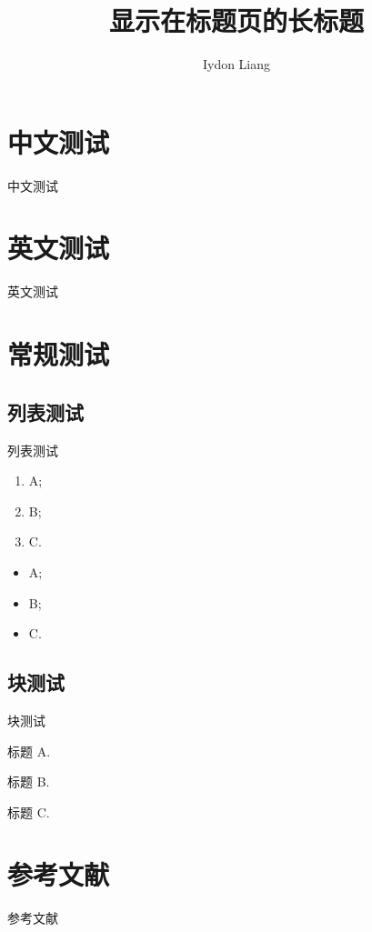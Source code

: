 \documentclass{ctexbeamer}
\title[短标题]{显示在标题页的长标题}
\author[Iydon]{Iydon Liang}
\institute[SUSTech]{Southern University of Science and Technology}
\begin{document}
\section{中文测试}
  \begin{frame}{中文测试}
    \zhlipsum[1]
  \end{frame}

\section{英文测试}
  \begin{frame}{英文测试}
    \lipsum[1]
  \end{frame}

\section{常规测试}
  \subsection{列表测试}
    \begin{frame}[<+->][t]{列表测试}
        \begin{enumerate}
        \item A;
        \item B;
        \item C.
        \end{enumerate}
        \begin{itemize}
        \item A;
        \item B;
        \item C.
        \end{itemize}
    \end{frame}

  \subsection{块测试}
    \begin{frame}[<+->][t]{块测试}
        \begin{block}{标题}
        A.
        \end{block}
        \begin{block}{标题}
        B.
        \end{block}
        \begin{block}{标题}
        C.
        \end{block}
    \end{frame}

\section{参考文献}
  \begin{frame}[t,allowframebreaks]{参考文献}
    \nocite{Nicholas1998Handbook}
    \printbibliography[]
  \end{frame}
    
\end{document}

